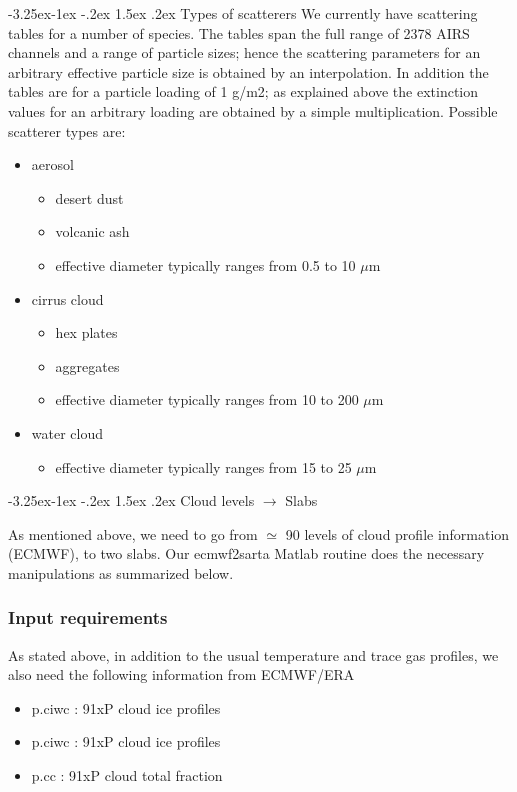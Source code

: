 \documentclass[11pt]{article}
\makeatletter
\renewcommand{\subsection}{\@startsection{subsection}{2}{\z@}%
                                     {-3.25ex\@plus -1ex \@minus -.2ex}%
                                     {1.5ex \@plus .2ex}%
                                     {\reset@font\normalsize\bfseries}}
\makeatother
\begin{document}
\subsection{Types of scatterers}
We currently have scattering tables for a number of species. The
tables span the full range of 2378 AIRS channels and a range of
particle sizes; hence the scattering parameters for an arbitrary
effective particle size is obtained by an interpolation. In addition
the tables are for a particle loading of 1 g/m2; as explained above
the extinction values for an arbitrary loading are obtained by a
simple multiplication.  Possible scatterer types are:
\begin{itemize}
\item aerosol
  \begin{itemize}
  \item desert dust
  \item volcanic ash
  \item effective diameter typically ranges from 0.5 to 10 $\mu$m
  \end{itemize}
\item cirrus cloud
  \begin{itemize}
  \item hex plates
  \item aggregates
  \item effective diameter typically ranges from 10 to 200 $\mu$m
  \end{itemize}
\item water cloud
  \begin{itemize}
  \item effective diameter typically ranges from 15 to 25 $\mu$m
  \end{itemize}
\end{itemize}

\subsection{Cloud levels $\rightarrow$ Slabs}

As mentioned above, we need to go from $\simeq$ 90 levels of cloud
profile information (ECMWF), to two slabs. Our \textsf{ecmwf2sarta}
Matlab routine does the necessary manipulations as summarized below.

\subsubsection{Input requirements}

As stated above, in addition to the usual temperature and trace gas
profiles, we also need the following information from ECMWF/ERA
\begin{itemize}
\item p.ciwc : 91xP cloud ice profiles
\item p.ciwc : 91xP cloud ice profiles
\item p.cc : 91xP cloud total fraction
\end{itemize}
\end{document}
